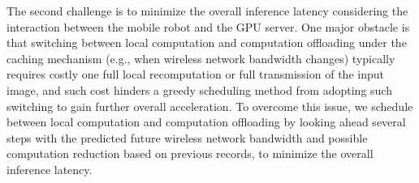 

The second challenge is to minimize the overall inference latency considering the interaction between the mobile robot and the GPU server.
One major obstacle is that switching between local computation and computation offloading under the caching mechanism (e.g., when wireless network bandwidth changes) typically requires costly one full local recomputation or full transmission of the input image, and such cost hinders a greedy scheduling method from adopting such switching to gain further overall acceleration.
To overcome this issue, we schedule between local computation and computation offloading by looking ahead several steps with the predicted future wireless network bandwidth and possible computation reduction based on previous records, to minimize the overall inference latency.

